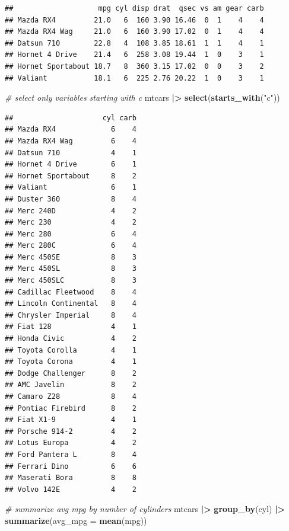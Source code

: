 \documentclass[
  12pt,
  oneside]{book}
\newenvironment{Shaded}{\begin{snugshade}}{\end{snugshade}}
\newcommand{\AttributeTok}[1]{\textcolor[rgb]{0.13,0.29,0.53}{#1}}
\newcommand{\CommentTok}[1]{\textcolor[rgb]{0.56,0.35,0.01}{\textit{#1}}}
\newcommand{\FunctionTok}[1]{\textcolor[rgb]{0.13,0.29,0.53}{\textbf{#1}}}
\newcommand{\NormalTok}[1]{#1}
\newcommand{\SpecialCharTok}[1]{\textcolor[rgb]{0.81,0.36,0.00}{\textbf{#1}}}
\newcommand{\StringTok}[1]{\textcolor[rgb]{0.31,0.60,0.02}{#1}}
\theoremstyle{definition}
\theoremstyle{definition}
\theoremstyle{definition}
\theoremstyle{definition}
\theoremstyle{remark}
\begin{document}
\begin{verbatim}
##                    mpg cyl disp drat  qsec vs am gear carb
## Mazda RX4         21.0   6  160 3.90 16.46  0  1    4    4
## Mazda RX4 Wag     21.0   6  160 3.90 17.02  0  1    4    4
## Datsun 710        22.8   4  108 3.85 18.61  1  1    4    1
## Hornet 4 Drive    21.4   6  258 3.08 19.44  1  0    3    1
## Hornet Sportabout 18.7   8  360 3.15 17.02  0  0    3    2
## Valiant           18.1   6  225 2.76 20.22  1  0    3    1
\end{verbatim}

\begin{Shaded}
\begin{Highlighting}[]
\CommentTok{\# select only variables starting with \textasciigrave{}c\textasciigrave{}}
\NormalTok{mtcars }\SpecialCharTok{|\textgreater{}} 
  \FunctionTok{select}\NormalTok{(}\FunctionTok{starts\_with}\NormalTok{(}\StringTok{"c"}\NormalTok{))}
\end{Highlighting}
\end{Shaded}

\begin{verbatim}
##                     cyl carb
## Mazda RX4             6    4
## Mazda RX4 Wag         6    4
## Datsun 710            4    1
## Hornet 4 Drive        6    1
## Hornet Sportabout     8    2
## Valiant               6    1
## Duster 360            8    4
## Merc 240D             4    2
## Merc 230              4    2
## Merc 280              6    4
## Merc 280C             6    4
## Merc 450SE            8    3
## Merc 450SL            8    3
## Merc 450SLC           8    3
## Cadillac Fleetwood    8    4
## Lincoln Continental   8    4
## Chrysler Imperial     8    4
## Fiat 128              4    1
## Honda Civic           4    2
## Toyota Corolla        4    1
## Toyota Corona         4    1
## Dodge Challenger      8    2
## AMC Javelin           8    2
## Camaro Z28            8    4
## Pontiac Firebird      8    2
## Fiat X1-9             4    1
## Porsche 914-2         4    2
## Lotus Europa          4    2
## Ford Pantera L        8    4
## Ferrari Dino          6    6
## Maserati Bora         8    8
## Volvo 142E            4    2
\end{verbatim}

\begin{Shaded}
\begin{Highlighting}[]
\CommentTok{\# summarize avg mpg by number of cylinders}
\NormalTok{mtcars }\SpecialCharTok{|\textgreater{}} 
  \FunctionTok{group\_by}\NormalTok{(cyl) }\SpecialCharTok{|\textgreater{}} 
  \FunctionTok{summarize}\NormalTok{(}\AttributeTok{avg\_mpg =} \FunctionTok{mean}\NormalTok{(mpg))}
\end{Highlighting}
\end{Shaded}
\end{document}
